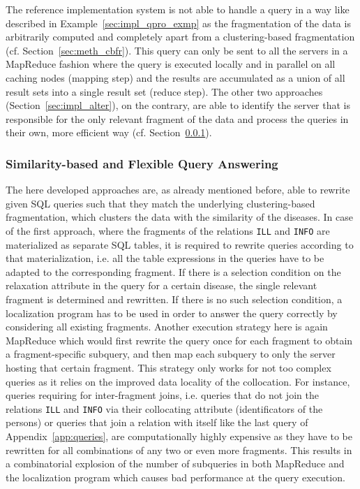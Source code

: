 The reference implementation system is not able to handle a query in a way like described in Example~\ref{sec:impl_qpro_exmp} as the fragmentation of the data
is arbitrarily computed and completely apart from a clustering-based fragmentation (cf. Section~\ref{sec:meth_cbfr}). This query can only be sent
to all the servers in a MapReduce \citep{MapReduce2004} fashion where the query is executed locally and in parallel on all caching nodes (mapping step) and the 
results are accumulated as a union of all result sets into a single result set (reduce step). The other two approaches (Section~\ref{sec:impl_alter}), on the
contrary, are able to identify the server that is responsible for the only relevant fragment of the data and process the queries in their own, more efficient
way (cf. Section~\ref{sec:impl_qpro_sbfq}).


\subsubsection{Similarity-based and Flexible Query Answering}
\label{sec:impl_qpro_sbfq}

The here developed approaches are, as already mentioned before, able to rewrite given SQL queries such that they match the underlying clustering-based
fragmentation, which clusters the data with the similarity of the diseases. In case of the first approach, where the fragments of the relations \verb!ILL! and
\verb!INFO! are materialized as separate SQL tables, it is required to rewrite queries according to that materialization, i.e. all the table expressions in the
queries have to be adapted to the corresponding fragment. If there is a selection condition on the relaxation attribute in the query for a certain disease, the
single relevant fragment is determined and rewritten. If there is no such selection condition, a localization program has to be used in order to answer the 
query correctly by considering all existing fragments. Another execution strategy here is again MapReduce \citep{MapReduce2004} which would first rewrite the 
query once for each fragment to obtain a fragment-specific subquery, and then map each subquery to only the server hosting that certain fragment. This strategy
only works for not too complex queries as it relies on the improved data locality of the collocation. For instance, queries requiring for inter-fragment joins,
i.e. queries that do not join the relations \verb!ILL! and \verb!INFO! via their collocating attribute (identificators of the persons) or queries that join a
relation with itself like the last query of Appendix~\ref{app:queries}, are computationally highly expensive as they have to be rewritten for all combinations
of any two or even more fragments. This results in a combinatorial explosion of the number of subqueries in both MapReduce and the localization program which
causes bad performance at the query execution.


